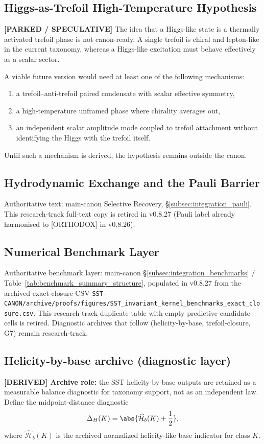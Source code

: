 \subsection{Higgs-as-Trefoil High-Temperature Hypothesis}
\label{subsec:rt_higgs_trefoil_parked}

\textbf{[PARKED / SPECULATIVE]} The idea that a Higgs-like state is a thermally activated trefoil phase is not canon-ready. A single trefoil is chiral and lepton-like in the current taxonomy, whereas a Higgs-like excitation must behave effectively as a scalar sector.

A viable future version would need at least one of the following mechanisms:
\begin{enumerate}
    \item a trefoil--anti-trefoil paired condensate with scalar effective symmetry,
    \item a high-temperature unframed phase where chirality averages out,
    \item an independent scalar amplitude mode coupled to trefoil attachment without identifying the Higgs with the trefoil itself.
\end{enumerate}
Until such a mechanism is derived, the hypothesis remains outside the canon.



\subsection{Hydrodynamic Exchange and the Pauli Barrier}
\noindent
Authoritative text: main-canon Selective Recovery, \S\ref{subsec:integration_pauli}. This research-track full-text copy is retired in v0.8.27 (Pauli label already harmonised to [ORTHODOX] in v0.8.26).

\subsection{Numerical Benchmark Layer}
\noindent
Authoritative benchmark layer: main-canon \S\ref{subsec:integration_benchmarks} / Table~\ref{tab:benchmark_summary_structure}, populated in v0.8.27 from the archived exact-closure CSV \texttt{SST-CANON/archive/proofs/figures/SST\_invariant\_kernel\_benchmarks\_exact\_closure.csv}. This research-track duplicate table with empty predictive-candidate cells is retired. Diagnostic archives that follow (helicity-by-base, trefoil-closure, G7) remain research-track.

\subsection{Helicity-by-base archive (diagnostic layer)}
\textbf{[DERIVED] Archive role:} the SST helicity-by-base outputs are retained as a measurable balance diagnostic for taxonomy support, not as an independent law.
Define the midpoint-distance diagnostic
\begin{align}
    \Delta_H(K)=\abs{\widehat{\mathcal{H}}_{b}(K)+\frac{1}{2}},
\end{align}
where $\widehat{\mathcal{H}}_{b}(K)$ is the archived normalized helicity-like base indicator for class $K$.


